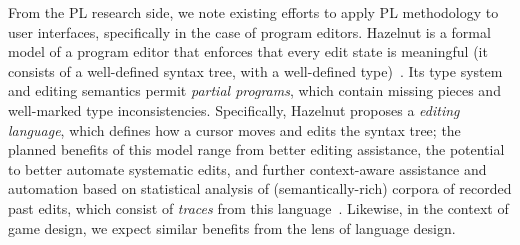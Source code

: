 From the PL research side, we note existing efforts to apply PL
methodology to user interfaces, specifically in the case of program
editors.
Hazelnut is a formal model of a program editor that enforces that
every edit state is meaningful (it consists of a well-defined syntax
tree, with a well-defined type)~\cite{omar17hazelnut}.
%
Its type system and editing semantics permit \emph{partial programs},
which contain missing pieces and well-marked type inconsistencies.
%
Specifically, Hazelnut proposes a \emph{editing language}, which
defines how a cursor moves and edits the syntax tree; the planned
benefits of this model range from better editing assistance, the
potential to better automate systematic edits, and further
context-aware assistance and automation based on statistical analysis
of (semantically-rich) corpora of recorded past edits, which consist
of \emph{traces} from this language~\cite{omar17hazel}.
%
Likewise, in the context of game design, 
we expect similar benefits from the lens of language design.

% 

